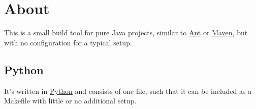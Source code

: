 
\section{ About }

This is a small build tool for pure Java projects, similar to
 \href{http://ant.apache.org}{Ant} or  \href{http://maven.apache.org}{Maven},
but with no configuration for a typical setup.



\subsection{ Python }

It's written in  \href{http://python.org}{Python} and consists of
one file, such that it can be included as a Makefile with little 
or no additional setup.





